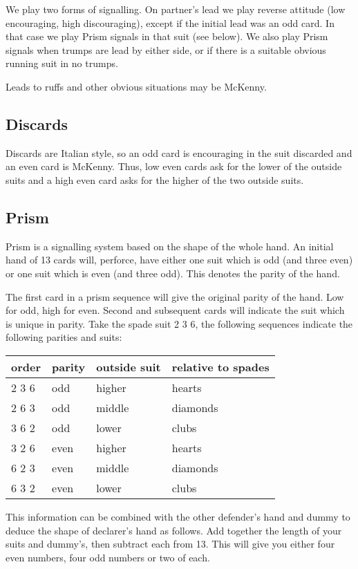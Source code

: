 \documentclass[a4paper,12pt]{article}
\begin{document}
We play two forms of signalling. On partner's lead we play reverse attitude
(low encouraging, high discouraging), except if the initial lead was an odd
card. In that case we play Prism signals in that suit (see below). We also play
Prism signals when trumps are lead by either side, or if there is a suitable
obvious running suit in no trumps.

Leads to ruffs and other obvious situations may be McKenny.

\subsection{Discards}

Discards are Italian style, so an odd card is encouraging in the suit discarded
and an even card is McKenny. Thus, low even cards ask for the lower of the
outside suits and a high even card asks for the higher of the two outside
suits.

\subsection{Prism}

Prism is a signalling system based on the shape of the whole hand. An initial
hand of 13 cards will, perforce, have either one suit which is odd (and three
even) or one suit which is even (and three odd). This denotes the parity of the
hand.

The first card in a prism sequence will give the original parity of the hand.
Low for odd, high for even. Second and subsequent cards will indicate the suit
which is unique in parity. Take the spade suit 2 3 6, the following sequences indicate
the following parities and suits:

\begin{tabular}{llll}
\bf order & \bf parity & \bf outside suit & \bf relative to spades \\
\hline
2 3 6 & odd    & higher       & hearts \\
2 6 3 & odd    & middle       & diamonds \\
3 6 2 & odd    & lower        & clubs \\
3 2 6 & even   & higher       & hearts \\
6 2 3 & even   & middle       & diamonds \\
6 3 2 & even   & lower        & clubs \\
\end{tabular}

This information can be combined with the other defender's hand and dummy to
deduce the shape of declarer's hand as follows. Add together the length of your
suits and dummy's, then subtract each from 13. This will give you either four
even numbers, four odd numbers or two of each.
\end{document}
